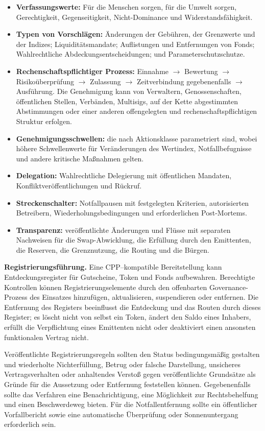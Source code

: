 \documentclass[11pt]{article}
\begin{document}
\begin{itemize}[leftmargin=*]
\item \textbf{Verfassungswerte:} Für die Menschen sorgen, für die Umwelt sorgen, Gerechtigkeit, Gegenseitigkeit, Nicht-Dominance und Widerstandsfähigkeit.
\item \textbf{Typen von Vorschlägen:} Änderungen der Gebühren, der Grenzwerte und der Indizes; Liquiditätsmandate; Auflistungen und Entfernungen von Fonds; Wahlrechtliche Abdeckungsentscheidungen; und Parameterschutzschutze.
\item \textbf{Rechenschaftspflichtiger Prozess:} Einnahme $\to$ Bewertung $\to$ Risikoüberprüfung $\to$ Zulassung $\to$ Zeitverbindung gegebenenfalls $\to$ Ausführung. Die Genehmigung kann von Verwaltern, Genossenschaften, öffentlichen Stellen, Verbänden, Multisigs, auf der Kette abgestimmten Abstimmungen oder einer anderen offengelegten und rechenschaftspflichtigen Struktur erfolgen.
\item \textbf{Genehmigungsschwellen:} die nach Aktionsklasse parametriert sind, wobei höhere Schwellenwerte für Veränderungen des Wertindex, Notfallbefugnisse und andere kritische Maßnahmen gelten.
\item \textbf{Delegation:} Wahlrechtliche Delegierung mit öffentlichen Mandaten, Konfliktveröffentlichungen und Rückruf.
\item \textbf{Streckenschalter:} Notfallpausen mit festgelegten Kriterien, autorisierten Betreibern, Wiederholungsbedingungen und erforderlichen Post-Mortems.
\item \textbf{Transparenz:} veröffentlichte Änderungen und Flüsse mit separaten Nachweisen für die Swap-Abwicklung, die Erfüllung durch den Emittenten, die Reserven, die Grenznutzung, die Routing und die Bürgen.
\end{itemize}
\textbf{Registrierungsführung.} Eine CPP--kompatible Bereitstellung kann Entdeckungsregister für Gutscheine, Token und Fonds aufbewahren. Berechtigte Kontrollen können Registrierungselemente durch den offenbarten Governance-Prozess des Einsatzes hinzufügen, aktualisieren, suspendieren oder entfernen. Die Entfernung des Registers beeinflusst die Entdeckung und das Routen durch dieses Register; es löscht nicht von selbst ein Token, ändert den Saldo eines Inhabers, erfüllt die Verpflichtung eines Emittenten nicht oder deaktiviert einen ansonsten funktionalen Vertrag nicht.

Veröffentlichte Registrierungsregeln sollten den Status bedingungsmäßig gestalten und wiederholte Nichterfüllung, Betrug oder falsche Darstellung, unsicheres Vertragsverhalten oder anhaltendes Verstoß gegen veröffentlichte Grundsätze als Gründe für die Aussetzung oder Entfernung feststellen können. Gegebenenfalls sollte das Verfahren eine Benachrichtigung, eine Möglichkeit zur Rechtsbehelfung und einen Beschwerdeweg bieten. Für die Notfallentfernung sollte ein öffentlicher Vorfallbericht sowie eine automatische Überprüfung oder Sonnenuntergang erforderlich sein.
\end{document}
